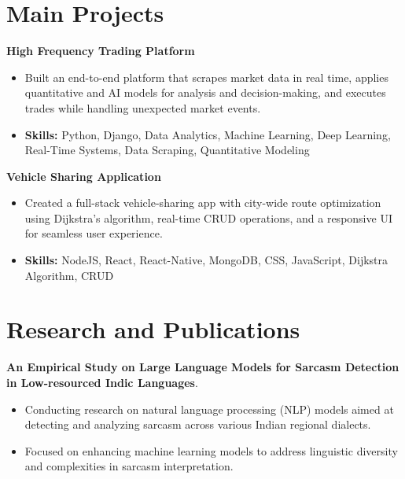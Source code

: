 \documentclass[a4paper,11pt]{article}
\begin{document}
\section{\textbf{Main Projects}}

\vspace{1mm}
  \textbf{High Frequency Trading Platform  }
\vspace{-1.5mm} %
\begin{itemize}
  \item Built an end-to-end platform that scrapes market data in real time, applies quantitative and AI models for analysis and decision-making, and executes trades while handling unexpected market events.
\vspace{-3mm}
  \item \textbf{Skills:} Python, Django, Data Analytics, Machine Learning, Deep Learning, Real-Time Systems, Data Scraping, Quantitative Modeling
\end{itemize}


\vspace{1mm}
   \textbf{Vehicle Sharing Application }
\vspace{-1.5mm} %
\begin{itemize}
  \item Created a full-stack vehicle-sharing app with city-wide route optimization using Dijkstra's algorithm, real-time CRUD operations, and a responsive UI for seamless user experience.
\vspace{-3mm}
  \item \textbf{Skills:} NodeJS, React, React-Native, MongoDB, CSS, JavaScript, Dijkstra Algorithm, CRUD
\end{itemize}



\section{\textbf{Research and Publications} \hfill }
\vspace{1mm}
  \textbf{An Empirical Study on Large Language Models for Sarcasm Detection in Low-resourced Indic Languages}.
\vspace{-1mm} %
\begin{itemize}
  \item Conducting research on natural language processing (NLP) models aimed at detecting and analyzing sarcasm across various Indian regional dialects.
\vspace{-3mm}
  \item Focused on enhancing machine learning models to address linguistic diversity and complexities in sarcasm interpretation.
\end{itemize}
\end{document}
